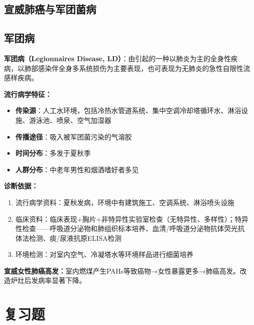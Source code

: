\documentclass[10pt,a4paper,oneside]{ctexbook}
\begin{document}
\subsection{宣威肺癌与军团菌病}

\subsection{军团病}

\begin{keybox}
\textbf{军团病（Legionnaires Disease, LD）}：由引起的一种以肺炎为主的全身性疾病，以肺部感染伴全身多系统损伤为主要表现，也可表现为无肺炎的急性自限性流感样疾病。

\textbf{流行病学特征：}
\begin{itemize}[leftmargin=*]
    \item \textbf{传染源}：人工水环境，包括冷热水管道系统、集中空调冷却塔循环水、淋浴设施、游泳池、喷泉、空气加湿器
    \item \textbf{传播途径}：吸入被军团菌污染的气溶胶
    \item \textbf{时间分布}：多发于夏秋季
    \item \textbf{人群分布}：中老年男性和烟酒嗜好者多见
\end{itemize}

\textbf{诊断依据：}
\begin{enumerate}[leftmargin=*]
    \item 流行病学资料：夏秋发病，环境中有建筑施工、空调系统、淋浴喷头设施
    \item 临床资料：临床表现+胸片+非特异性实验室检查（无特异性、多样性）；特异性检查——呼吸道分泌物和肺组织标本培养、血清/呼吸道分泌物抗体荧光抗体法检测、痰/尿液抗原ELISA检测
    \item 环境检测：对室内空气、冷凝塔水等环境样品进行细菌培养
\end{enumerate}
\end{keybox}

\begin{tipbox}
\textbf{宣威女性肺癌高发：}室内燃煤产生PAHs等致癌物→女性暴露更多→肺癌高发。改造炉灶后发病率显著下降。
\end{tipbox}

\section{复习题}
\end{document}

